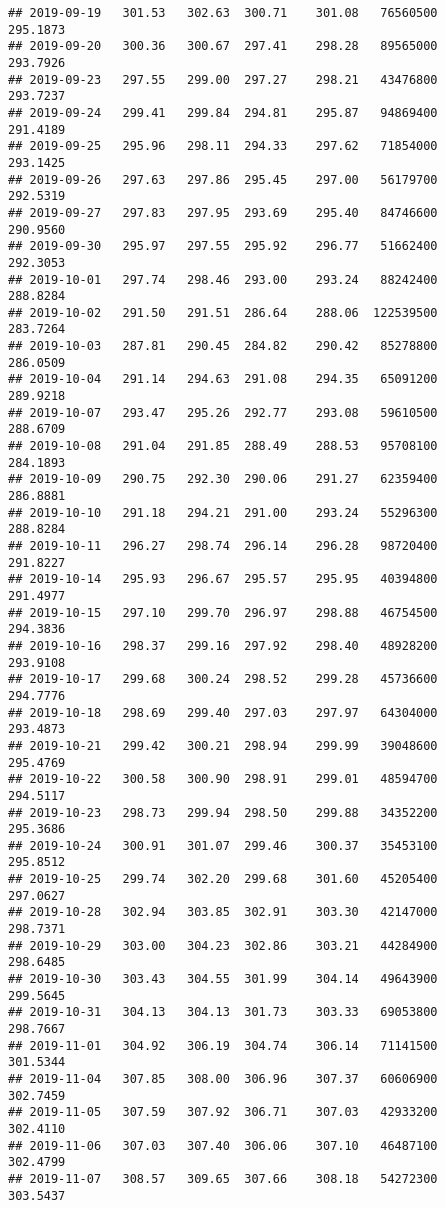 \documentclass[
]{article}
\begin{document}
\begin{verbatim}
## 2019-09-19   301.53   302.63  300.71    301.08   76560500     295.1873
## 2019-09-20   300.36   300.67  297.41    298.28   89565000     293.7926
## 2019-09-23   297.55   299.00  297.27    298.21   43476800     293.7237
## 2019-09-24   299.41   299.84  294.81    295.87   94869400     291.4189
## 2019-09-25   295.96   298.11  294.33    297.62   71854000     293.1425
## 2019-09-26   297.63   297.86  295.45    297.00   56179700     292.5319
## 2019-09-27   297.83   297.95  293.69    295.40   84746600     290.9560
## 2019-09-30   295.97   297.55  295.92    296.77   51662400     292.3053
## 2019-10-01   297.74   298.46  293.00    293.24   88242400     288.8284
## 2019-10-02   291.50   291.51  286.64    288.06  122539500     283.7264
## 2019-10-03   287.81   290.45  284.82    290.42   85278800     286.0509
## 2019-10-04   291.14   294.63  291.08    294.35   65091200     289.9218
## 2019-10-07   293.47   295.26  292.77    293.08   59610500     288.6709
## 2019-10-08   291.04   291.85  288.49    288.53   95708100     284.1893
## 2019-10-09   290.75   292.30  290.06    291.27   62359400     286.8881
## 2019-10-10   291.18   294.21  291.00    293.24   55296300     288.8284
## 2019-10-11   296.27   298.74  296.14    296.28   98720400     291.8227
## 2019-10-14   295.93   296.67  295.57    295.95   40394800     291.4977
## 2019-10-15   297.10   299.70  296.97    298.88   46754500     294.3836
## 2019-10-16   298.37   299.16  297.92    298.40   48928200     293.9108
## 2019-10-17   299.68   300.24  298.52    299.28   45736600     294.7776
## 2019-10-18   298.69   299.40  297.03    297.97   64304000     293.4873
## 2019-10-21   299.42   300.21  298.94    299.99   39048600     295.4769
## 2019-10-22   300.58   300.90  298.91    299.01   48594700     294.5117
## 2019-10-23   298.73   299.94  298.50    299.88   34352200     295.3686
## 2019-10-24   300.91   301.07  299.46    300.37   35453100     295.8512
## 2019-10-25   299.74   302.20  299.68    301.60   45205400     297.0627
## 2019-10-28   302.94   303.85  302.91    303.30   42147000     298.7371
## 2019-10-29   303.00   304.23  302.86    303.21   44284900     298.6485
## 2019-10-30   303.43   304.55  301.99    304.14   49643900     299.5645
## 2019-10-31   304.13   304.13  301.73    303.33   69053800     298.7667
## 2019-11-01   304.92   306.19  304.74    306.14   71141500     301.5344
## 2019-11-04   307.85   308.00  306.96    307.37   60606900     302.7459
## 2019-11-05   307.59   307.92  306.71    307.03   42933200     302.4110
## 2019-11-06   307.03   307.40  306.06    307.10   46487100     302.4799
## 2019-11-07   308.57   309.65  307.66    308.18   54272300     303.5437

\end{verbatim}
\end{document}
